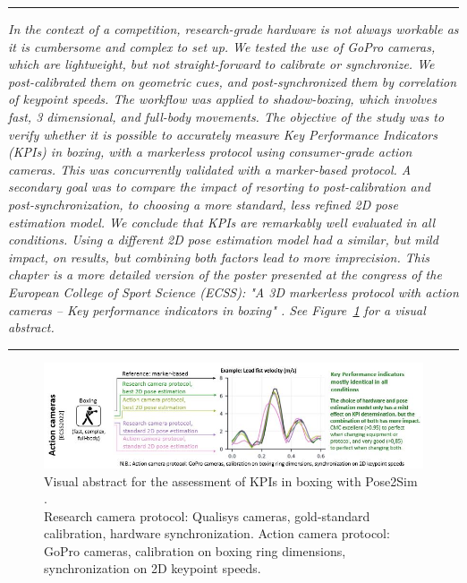 \begin{center}
\rule{0.7\linewidth}{.5pt}
\begin{minipage}{0.7\linewidth}
\smallskip

\textit{In the context of a competition, research-grade hardware is not always workable as it is cumbersome and complex to set up. We tested the use of GoPro cameras, which are lightweight, but not straight-forward to calibrate or synchronize. We post-calibrated them on geometric cues, and post-synchronized them by correlation of keypoint speeds. The workflow was applied to shadow-boxing, which involves fast, 3 dimensional, and full-body movements. \newline\newline
The objective of the study was to verify whether it is possible to accurately measure Key Performance Indicators (KPIs) in boxing, with a markerless protocol using consumer-grade action cameras. This was concurrently validated with a marker-based protocol. A secondary goal was to compare the impact of resorting to post-calibration and post-synchronization, to choosing a more standard, less refined 2D pose estimation model. We conclude that KPIs are remarkably well evaluated in all conditions. Using a different 2D pose estimation model had a similar, but mild impact, on results, but combining both factors lead to more imprecision.\newline \newline
This chapter is a more detailed version of the poster presented at the congress of the European College of Sport Science (ECSS): "A 3D markerless protocol with action cameras – Key performance indicators in boxing" \cite{Pagnon2022c}. See Figure~\ref{fig_visabstract4} for a visual abstract.
}

\end{minipage}
\smallskip
\rule{0.7\linewidth}{.5pt}
\end{center}

\clearpage

\minitoc

\vspace*{3cm}

\begin{figure}[hbtp]
	\centering
      \captionsetup{justification=centering}
	\def\svgwidth{1\columnwidth}
	\fontsize{10pt}{10pt}\selectfont
	\includegraphics[width=\linewidth]{"../Intro/Figures/Fig_VisAbstract4.JPG"}
      \caption{Visual abstract for the assessment of KPIs in boxing with Pose2Sim \cite{Pagnon2022c}. \\Research camera protocol: Qualisys cameras, gold-standard calibration, hardware synchronization. Action camera protocol: GoPro cameras, calibration on boxing ring dimensions, synchronization on 2D keypoint speeds.}
	\label{fig_visabstract4}
\end{figure}


